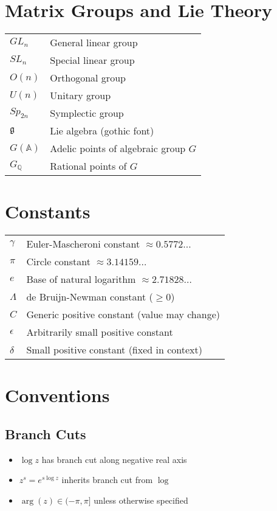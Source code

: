 \section{Matrix Groups and Lie Theory}

\begin{tabular}{ll}
$GL_n$ & General linear group \\
$SL_n$ & Special linear group \\
$O(n)$ & Orthogonal group \\
$U(n)$ & Unitary group \\
$Sp_{2n}$ & Symplectic group \\
$\mathfrak{g}$ & Lie algebra (gothic font) \\
$G(\mathbb{A})$ & Adelic points of algebraic group $G$ \\
$G_{\mathbb{Q}}$ & Rational points of $G$ \\
\end{tabular}

\section{Constants}

\begin{tabular}{ll}
$\gamma$ & Euler-Mascheroni constant $\approx 0.5772\ldots$ \\
$\pi$ & Circle constant $\approx 3.14159\ldots$ \\
$e$ & Base of natural logarithm $\approx 2.71828\ldots$ \\
$\Lambda$ & de Bruijn-Newman constant ($\geq 0$) \\
$C$ & Generic positive constant (value may change) \\
$\epsilon$ & Arbitrarily small positive constant \\
$\delta$ & Small positive constant (fixed in context) \\
\end{tabular}

\section{Conventions}

\subsection{Branch Cuts}
\begin{itemize}
\item $\log z$ has branch cut along negative real axis
\item $z^s = e^{s \log z}$ inherits branch cut from $\log$
\item $\arg(z) \in (-\pi, \pi]$ unless otherwise specified
\end{itemize}

